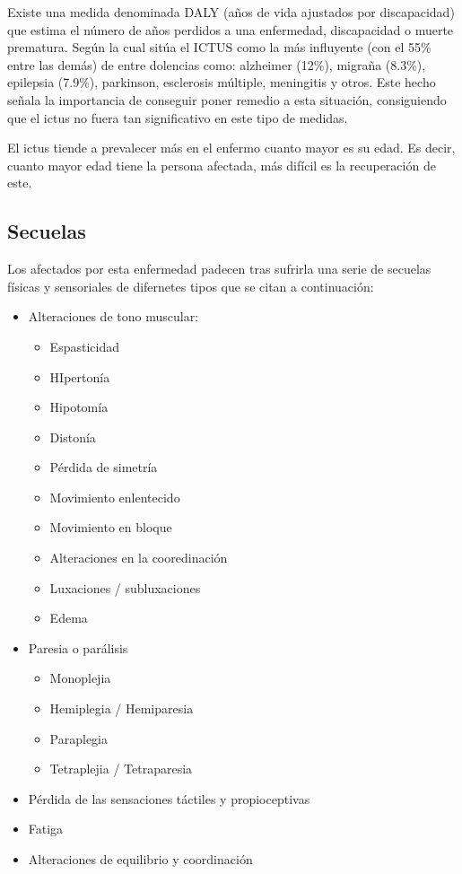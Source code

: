 Existe una medida denominada DALY (años de vida ajustados por discapacidad) que estima el número de años perdidos a una enfermedad, discapacidad o muerte prematura. Según la cual sitúa el ICTUS como la más influyente (con el 55\% entre las demás) de entre dolencias como: alzheimer (12\%), migraña (8.3\%), epilepsia (7.9\%), parkinson, esclerosis múltiple, meningitis y otros. Este hecho señala la importancia de conseguir poner remedio a esta situación, consiguiendo que el ictus no fuera tan significativo en este tipo de medidas.

El ictus tiende a prevalecer más en el enfermo cuanto mayor es su edad. Es decir, cuanto mayor edad tiene la persona afectada, más difícil es la recuperación de este.

\cite{pentienII}

\subsection{Secuelas}
\label{sec:secuelas}

Los afectados por esta enfermedad padecen tras sufrirla una serie de secuelas físicas y sensoriales de difernetes tipos que se citan a continuación:

\begin{itemize}[label=$ \rhd $]
	\item Alteraciones de tono muscular:
	\begin{itemize}[label=$ \longrightarrow $]
		\item Espasticidad
		\item HIpertonía
		\item Hipotomía
		\item Distonía
		\item Pérdida de simetría
		\item Movimiento enlentecido
		\item Movimiento en bloque
		\item Alteraciones en la cooredinación
		\item Luxaciones / subluxaciones
		\item Edema
	\end{itemize}
	\item Paresia o parálisis
	\begin{itemize}[label=$ \longrightarrow $]
		\item Monoplejia
		\item Hemiplegia / Hemiparesia
		\item Paraplegia
		\item Tetraplejia / Tetraparesia
	\end{itemize}
	\item Pérdida de las sensaciones táctiles y propioceptivas
	\item Fatiga
	\item Alteraciones de equilibrio y coordinación
\end{itemize}

